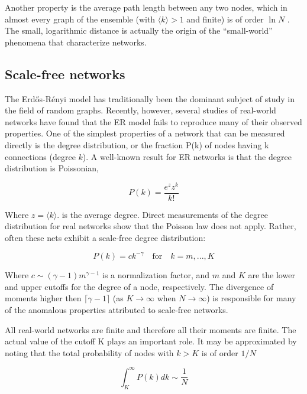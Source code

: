 \nd Another property is the average path length between any two nodes, which in almost every graph of the ensemble (with $\langle k \rangle > 1$ and finite) is of order $\ln N$ . The small, logarithmic distance is actually the origin of the “small-world” phenomena that characterize networks.


\subsection{Scale-free networks}

\nd The Erdős-Rényi model has traditionally been the dominant subject of study in the field of random graphs. Recently, however, several studies of real-world networks have found that the ER model fails to reproduce many of their observed properties. One of the simplest properties of a network that can be measured directly is the degree distribution, or the fraction P(k) of nodes having k connections (degree $k$). A well-known result for ER networks is that the degree distribution is Poissonian,

\begin{equation}
    P(k) = \frac{e^{z} z^k}{k!}
\end{equation}

\nd Where $z = \langle k \rangle$. is the average degree. \s Direct measurements of the degree distribution for real networks show that the Poisson law does not apply. Rather, often these nets exhibit a scale-free degree distribution:

\begin{equation}
    P(k) = ck^{-\gamma} \quad \text{for} \quad k = m, ... , K
\end{equation}

\nd Where $c \sim (\gamma -1)m^{\gamma - 1}$ is a normalization factor, and $m$ and $K$ are the lower and upper cutoffs for the degree of a node, respectively. The divergence of moments higher then $\lceil \gamma -1 \rceil$ (as  $K \to \infty$ when $N \to \infty$) is responsible for many of the anomalous properties attributed to scale-free networks. \s

\nd All real-world networks are finite and therefore all their moments are finite. The actual value of the cutoff K plays an important role. It may be approximated by noting that the total probability of nodes with $k > K$ is of order $1/N$

\begin{equation}
    \int_K^\infty P(k) dk \sim \frac{1}{N}
\end{equation}


